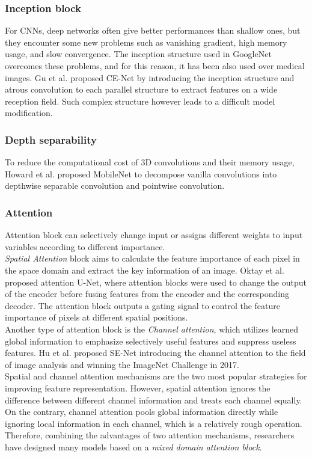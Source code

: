 \subsubsection{Inception block}
For CNNs, deep networks often give better performances than shallow ones, but
they encounter some new problems such as vanishing gradient, high memory usage,
and slow convergence. The inception structure used in GoogleNet
\cite{szegedy2015googlenet,szegedy2016rethinking} overcomes these problems, and
for this reason, it has been also used over medical images. Gu et al.
\cite{guan2019fully} proposed CE-Net by introducing the inception structure
and atrous convolution to each parallel structure to extract features on a
wide reception field. Such complex structure however leads to a difficult
model modification.

\subsubsection{Depth separability}
To reduce the computational cost of 3D convolutions and their memory usage,
Howard et al. \cite{howard2017mobilenets} proposed MobileNet to decompose
vanilla convolutions into depthwise separable convolution and pointwise
convolution.

\subsubsection{Attention}
\par
Attention block can selectively change input or assigns different weights to
input variables according to different importance.\\
\emph{Spatial Attention} block aims to calculate the feature importance of each
pixel in the space domain and extract the key information of an image. Oktay et
al. \cite{oktay2018attentionunet} proposed attention U-Net, where attention
blocks were used to change the output of the encoder before fusing features from
the encoder and the corresponding decoder.
The attention block outputs a gating signal to control the feature importance of
pixels at different spatial positions.\\
Another type of attention block is the \emph{Channel attention}, which utilizes
learned global information to emphasize selectively useful features and suppress
useless features. Hu et al. \cite{hu2018squeeze} proposed SE-Net introducing the
channel attention to the field of image analysis and winning the ImageNet
Challenge in 2017.\\
Spatial and channel attention mechanisms are the two most popular strategies for
improving feature representation. However, spatial attention ignores the
difference between different channel information and treats each channel
equally. On the contrary, channel attention pools global information directly
while ignoring local information in each channel, which is a relatively rough
  operation. Therefore, combining the advantages of two attention mechanisms,
  researchers have designed many models based on a \emph{mixed domain attention
  block}.

